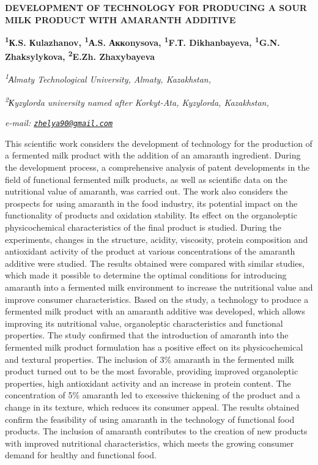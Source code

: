 \begin{articleheader}
{\bfseries DEVELOPMENT OF TECHNOLOGY FOR PRODUCING A SOUR MILK PRODUCT WITH AMARANTH ADDITIVE}

{\bfseries
\textsuperscript{1}К.S. Кulazhanov,
\textsuperscript{1}А.S. Аккonysova\textsuperscript{\envelope },
\textsuperscript{1}F.Т. Dikhanbayeva,
\textsuperscript{1}G.N. Zhaksylykova,
\textsuperscript{2}E.Zh. Zhaxybayeva}
\end{articleheader}

\begin{affiliation}
\emph{\textsuperscript{1}Аlmaty Technological University, Almaty, Kazakhstan,}

\emph{\textsuperscript{2}Кyzylorda university named after Korkyt-Ata, Kyzylorda, Kazakhstan,}

\emph{e-mail: \href{mailto:zhelya90@gmail.com}{\nolinkurl{zhelya90@gmail.com}}}
\end{affiliation}

This scientific work considers the development of technology for the
production of a fermented milk product with the addition of an amaranth
ingredient. During the development process, a comprehensive analysis of
patent developments in the field of functional fermented milk products,
as well as scientific data on the nutritional value of amaranth, was
carried out. The work also considers the prospects for using amaranth in
the food industry, its potential impact on the functionality of products
and oxidation stability. Its effect on the organoleptic physicochemical
characteristics of the final product is studied. During the experiments,
changes in the structure, acidity, viscosity, protein composition and
antioxidant activity of the product at various concentrations of the
amaranth additive were studied. The results obtained were compared with
similar studies, which made it possible to determine the optimal
conditions for introducing amaranth into a fermented milk environment to
increase the nutritional value and improve consumer characteristics.
Based on the study, a technology to produce a fermented milk product
with an amaranth additive was developed, which allows improving its
nutritional value, organoleptic characteristics and functional
properties. The study confirmed that the introduction of amaranth into
the fermented milk product formulation has a positive effect on its
physicochemical and textural properties. The inclusion of 3\% amaranth
in the fermented milk product turned out to be the most favorable,
providing improved organoleptic properties, high antioxidant activity
and an increase in protein content. The concentration of 5\% amaranth
led to excessive thickening of the product and a change in its texture,
which reduces its consumer appeal. The results obtained confirm the
feasibility of using amaranth in the technology of functional food
products. The inclusion of amaranth contributes to the creation of new
products with improved nutritional characteristics, which meets the
growing consumer demand for healthy and functional food.

